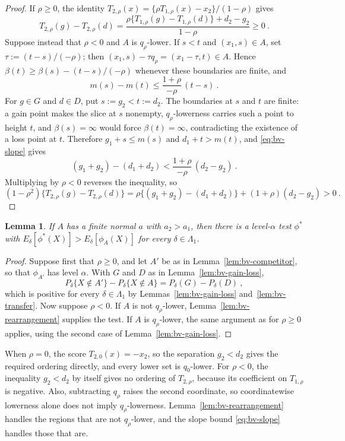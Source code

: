 \documentclass[11pt]{article}
\newcommand{\red}[1]{{\color{red}#1}} %
\numberwithin{equation}{section}
\newtheorem{lemma}{Lemma}
\theoremstyle{definition}
\begin{document}
\begin{proof}
If $\rho\ge0$, the identity $T_{2,\rho}(x)=\{\rho T_{1,\rho}(x)-x_2\}/(1-\rho)$ gives
\[
T_{2,\rho}(g)-T_{2,\rho}(d)=\frac{\rho\{T_{1,\rho}(g)-T_{1,\rho}(d)\}+d_2-g_2}{1-\rho}\ge0~.
\]
Suppose instead that $\rho<0$ and $A$ is $q_\rho$-lower. If $s<t$ and $(x_1,s)\in A$, set $\tau:=(t-s)/(-\rho)$; then $(x_1,s)-\tau q_\rho=(x_1-\tau,t)\in A$. Hence $\beta(t)\ge\beta(s)-(t-s)/(-\rho)$ whenever these boundaries are finite, and
\begin{equation}\label{eq:bv-slope}
m(s)-m(t)\le\frac{1+\rho}{-\rho}\,(t-s)~.
\end{equation}
For $g\in G$ and $d\in D$, put $s:=g_2<t:=d_2$. The boundaries at $s$ and $t$ are finite: a gain point makes the slice at $s$ nonempty, $q_\rho$-lowerness carries such a point to height $t$, and $\beta(s)=\infty$ would force $\beta(t)=\infty$, contradicting the existence of a loss point at $t$. Therefore $g_1+s\le m(s)$ and $d_1+t>m(t)$, and \eqref{eq:bv-slope} gives
\[
(g_1+g_2)-(d_1+d_2)<\frac{1+\rho}{-\rho}\,(d_2-g_2)~.
\]
Multiplying by $\rho<0$ reverses the inequality, so
\[
(1-\rho^2)\{T_{2,\rho}(g)-T_{2,\rho}(d)\}=\rho\{(g_1+g_2)-(d_1+d_2)\}+(1+\rho)(d_2-g_2)>0~.
\]
\end{proof}

\begin{lemma}\label{lem:bv-necessity}
If $A$ has a finite normal $a$ with $a_2>a_1$, then there is a level-$\alpha$ test $\phi^*$ with $E_\delta[\phi^*(X)]>E_\delta[\phi_A(X)]$ for every $\delta\in\Lambda_1$.
\end{lemma}

\begin{proof}
Suppose first that $\rho\ge0$, and let $A'$ be as in Lemma~\ref{lem:bv-competitor}, so that $\phi_{A'}$ has level $\alpha$. With $G$ and $D$ as in Lemma~\ref{lem:bv-gain-loss},
\[
P_\delta\{X\notin A'\}-P_\delta\{X\notin A\}=P_\delta(G)-P_\delta(D)~,
\]
which is positive for every $\delta\in\Lambda_1$ by Lemmas~\ref{lem:bv-gain-loss} and~\ref{lem:bv-transfer}. Now suppose $\rho<0$. If $A$ is not $q_\rho$-lower, Lemma~\ref{lem:bv-rearrangement} supplies the test. If $A$ is $q_\rho$-lower, the same argument as for $\rho\ge0$ applies, using the second case of Lemma~\ref{lem:bv-gain-loss}.
\end{proof}

When $\rho=0$, the score $T_{2,0}(x)=-x_2$, so the separation $g_2<d_2$ gives the required ordering directly, and every lower set is $q_0$-lower. \red{For $\rho<0$, the inequality $g_2<d_2$ by itself gives no ordering of $T_{2,\rho}$, because its coefficient on $T_{1,\rho}$ is negative. Also, subtracting $q_\rho$ raises the second coordinate, so coordinatewise lowerness alone does not imply $q_\rho$-lowerness.} Lemma~\ref{lem:bv-rearrangement} handles the regions that are not $q_\rho$-lower, and the slope bound \eqref{eq:bv-slope} handles those that are.
\end{document}

